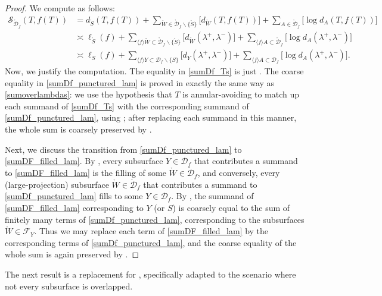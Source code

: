 \documentclass[11pt,letterpaper]{amsart}
\newcommand{\mc}{\mathcal}
\newcommand{\mr}{\mathring}
\newcommand{\psub}{\mr W}
\numberwithin{equation}{section}
\theoremstyle{definition}
\renewcommand{\setminus}{\smallsetminus}
\begin{document}
\begin{proof}
We compute as follows:
\begin{align}
\mc S_{\mr{\mc D}_f} (T, f(T)) &=    d_{\mr S}(T, f(T)) + \sum_{\psub \in \mr{\mc D}_f \setminus \{ \mr S \}} \big[ d_{\psub}(T, f(T)) \big] + \sum_{A \in \mr{\mc D}_f} \big[ \log d_A(T, f(T)) \big] 
\label{sumDf_Ts} \\
& \asymp  \ell_{\mr S}(f) + \sum_{\langle f \rangle \psub \subset \mr{\mc D}_f \setminus \{ \mr S \}} \big[d_{\psub}(\lambda^+, \lambda^-)\big] + \sum_{\langle f \rangle A \subset \mr{\mc D}_f} \big[\log d_A(\lambda^+, \lambda^-)\big] 
\label{sumDf_punctured_lam} \\
& \asymp  \ell_{S}(f) + \sum_{\langle f \rangle Y \subset {\mc D}_f \setminus \{ S \}} \big[d_{Y}(\lambda^+, \lambda^-)\big] + \sum_{\langle f \rangle A \subset {\mc D}_f} \big[\log d_A(\lambda^+, \lambda^-)\big].
\label{sumDF_filled_lam}
\end{align}
Now, we justify the computation. The equality in \eqref{sumDf_Ts} is just . The coarse equality in \eqref{sumDf_punctured_lam} is proved in exactly the same way as \eqref{sumoverlambdas}: we use the hypothesis that $T$ is annular-avoiding to match up each summand of \eqref{sumDf_Ts} with the corresponding summand of \eqref{sumDf_punctured_lam}, using ; after replacing each summand in this manner, the whole sum is coarsely preserved by .

Next, we discuss the transition from \eqref{sumDf_punctured_lam} to  \eqref{sumDF_filled_lam}. 
By , every subsurface $Y \in \mc D_f$ that contributes a summand to \eqref{sumDF_filled_lam} is the filling of some $\psub \in  \mr{\mc D}_f$, and conversely, every (large-projection) subsurface $\psub \in  \mr{\mc D}_f$ that contributes a summand to  \eqref{sumDf_punctured_lam} fills to some $Y \in \mc D_f$. By , the  summand of \eqref{sumDF_filled_lam} corresponding to $Y$ (or $S$) is coarsely equal to the sum of finitely many terms of \eqref{sumDf_punctured_lam}, corresponding to the subsurfaces $\psub \in \mc F_Y$. 
Thus we may replace each term of \eqref{sumDF_filled_lam} by the corresponding terms of \eqref{sumDf_punctured_lam}, and the coarse equality of the whole sum is again preserved by  .
\end{proof}

The next result is a replacement for , specifically adapted to the scenario where not every subsurface is overlapped.
\end{document}
